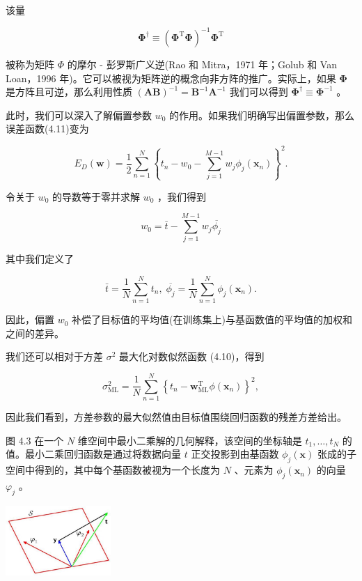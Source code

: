 \documentclass[10pt]{article}
\begin{document}
该量

\[
{\mathbf{\Phi }}^{ \dagger  } \equiv  {\left( {\mathbf{\Phi }}^{\mathrm{T}}\mathbf{\Phi }\right) }^{-1}{\mathbf{\Phi }}^{\mathrm{T}} \tag{4.16}
\]

被称为矩阵 \(\Phi\) 的摩尔 - 彭罗斯广义逆(Rao 和 Mitra，1971 年；Golub 和 Van Loan，1996 年)。它可以被视为矩阵逆的概念向非方阵的推广。实际上，如果 \(\mathbf{\Phi }\) 是方阵且可逆，那么利用性质 \({\left( \mathbf{{AB}}\right) }^{-1} = {\mathbf{B}}^{-1}{\mathbf{A}}^{-1}\) 我们可以得到 \({\mathbf{\Phi }}^{ \dagger  } \equiv  {\mathbf{\Phi }}^{-1}\) 。

此时，我们可以深入了解偏置参数 \({w}_{0}\) 的作用。如果我们明确写出偏置参数，那么误差函数(4.11)变为

\[
{E}_{D}\left( \mathbf{w}\right)  = \frac{1}{2}\mathop{\sum }\limits_{{n = 1}}^{N}{\left\{  {t}_{n} - {w}_{0} - \mathop{\sum }\limits_{{j = 1}}^{{M - 1}}{w}_{j}{\phi }_{j}\left( {\mathbf{x}}_{n}\right) \right\}  }^{2}. \tag{4.17}
\]

令关于 \({w}_{0}\) 的导数等于零并求解 \({w}_{0}\) ，我们得到

\[
{w}_{0} = \bar{t} - \mathop{\sum }\limits_{{j = 1}}^{{M - 1}}{w}_{j}\overline{{\phi }_{j}} \tag{4.18}
\]

其中我们定义了

\[
\bar{t} = \frac{1}{N}\mathop{\sum }\limits_{{n = 1}}^{N}{t}_{n},\;\overline{{\phi }_{j}} = \frac{1}{N}\mathop{\sum }\limits_{{n = 1}}^{N}{\phi }_{j}\left( {\mathbf{x}}_{n}\right) . \tag{4.19}
\]

因此，偏置 \({w}_{0}\) 补偿了目标值的平均值(在训练集上)与基函数值的平均值的加权和之间的差异。

我们还可以相对于方差 \({\sigma }^{2}\) 最大化对数似然函数 (4.10)，得到

\[
{\sigma }_{\mathrm{{ML}}}^{2} = \frac{1}{N}\mathop{\sum }\limits_{{n = 1}}^{N}{\left\{  {t}_{n} - {\mathbf{w}}_{\mathrm{{ML}}}^{\mathrm{T}}\phi \left( {\mathbf{x}}_{n}\right) \right\}  }^{2}, \tag{4.20}
\]

因此我们看到，方差参数的最大似然值由目标值围绕回归函数的残差方差给出。

图 4.3 在一个 \(N\) 维空间中最小二乘解的几何解释，该空间的坐标轴是 \({t}_{1},\ldots ,{t}_{N}\) 的值。最小二乘回归函数是通过将数据向量 \(t\) 正交投影到由基函数 \({\phi }_{j}\left( \mathbf{x}\right)\) 张成的子空间中得到的，其中每个基函数被视为一个长度为 \(N\) 、元素为 \({\phi }_{j}\left( {\mathbf{x}}_{n}\right)\) 的向量 \({\varphi }_{j}\) 。

\begin{center}
\includegraphics[max width=0.3\textwidth]{images/0194e279-9b28-703a-88f4-c3ac21e2010d_136_1070_347_483_322_0.jpg}
\end{center}
\hspace*{3em} 
\end{document}
